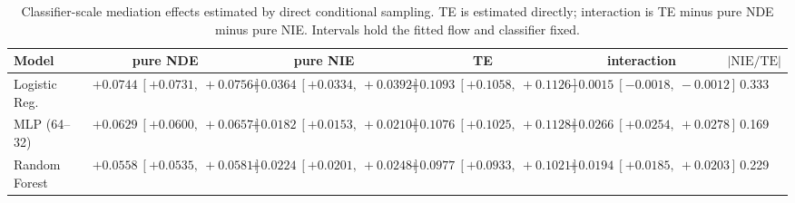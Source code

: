 \begin{table}[htbp]
  \centering
  \caption{Classifier-scale mediation effects estimated by direct conditional sampling. TE is estimated directly; interaction is TE minus pure NDE minus pure NIE. Intervals hold the fitted flow and classifier fixed.}
  \label{tab:acs_gap_overall}
  \begin{tabular}{lccccc}
    \toprule
    Model & pure NDE & pure NIE & TE & interaction & $|\mathrm{NIE}/\mathrm{TE}|$ \\
    \midrule
    Logistic Reg. & $+0.0744\ [+0.0731,\ +0.0756]$ & $+0.0364\ [+0.0334,\ +0.0392]$ & $+0.1093\ [+0.1058,\ +0.1126]$ & $-0.0015\ [-0.0018,\ -0.0012]$ & 0.333 \\
    MLP (64--32) & $+0.0629\ [+0.0600,\ +0.0657]$ & $+0.0182\ [+0.0153,\ +0.0210]$ & $+0.1076\ [+0.1025,\ +0.1128]$ & $+0.0266\ [+0.0254,\ +0.0278]$ & 0.169 \\
    Random Forest & $+0.0558\ [+0.0535,\ +0.0581]$ & $+0.0224\ [+0.0201,\ +0.0248]$ & $+0.0977\ [+0.0933,\ +0.1021]$ & $+0.0194\ [+0.0185,\ +0.0203]$ & 0.229 \\
    \bottomrule
  \end{tabular}
\end{table}
